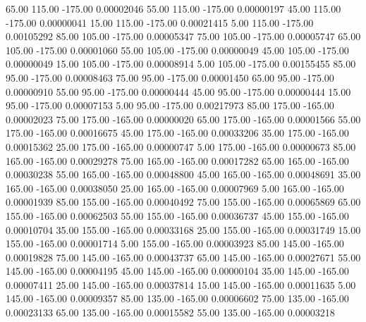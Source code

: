      65.00    115.00   -175.00     0.00002046
     55.00    115.00   -175.00     0.00000197
     45.00    115.00   -175.00     0.00000041
     15.00    115.00   -175.00     0.00021415
      5.00    115.00   -175.00     0.00105292
     85.00    105.00   -175.00     0.00005347
     75.00    105.00   -175.00     0.00005747
     65.00    105.00   -175.00     0.00001060
     55.00    105.00   -175.00     0.00000049
     45.00    105.00   -175.00     0.00000049
     15.00    105.00   -175.00     0.00008914
      5.00    105.00   -175.00     0.00155455
     85.00     95.00   -175.00     0.00008463
     75.00     95.00   -175.00     0.00001450
     65.00     95.00   -175.00     0.00000910
     55.00     95.00   -175.00     0.00000444
     45.00     95.00   -175.00     0.00000444
     15.00     95.00   -175.00     0.00007153
      5.00     95.00   -175.00     0.00217973
     85.00    175.00   -165.00     0.00002023
     75.00    175.00   -165.00     0.00000020
     65.00    175.00   -165.00     0.00001566
     55.00    175.00   -165.00     0.00016675
     45.00    175.00   -165.00     0.00033206
     35.00    175.00   -165.00     0.00015362
     25.00    175.00   -165.00     0.00000747
      5.00    175.00   -165.00     0.00000673
     85.00    165.00   -165.00     0.00029278
     75.00    165.00   -165.00     0.00017282
     65.00    165.00   -165.00     0.00030238
     55.00    165.00   -165.00     0.00048800
     45.00    165.00   -165.00     0.00048691
     35.00    165.00   -165.00     0.00038050
     25.00    165.00   -165.00     0.00007969
      5.00    165.00   -165.00     0.00001939
     85.00    155.00   -165.00     0.00040492
     75.00    155.00   -165.00     0.00065869
     65.00    155.00   -165.00     0.00062503
     55.00    155.00   -165.00     0.00036737
     45.00    155.00   -165.00     0.00010704
     35.00    155.00   -165.00     0.00033168
     25.00    155.00   -165.00     0.00031749
     15.00    155.00   -165.00     0.00001714
      5.00    155.00   -165.00     0.00003923
     85.00    145.00   -165.00     0.00019828
     75.00    145.00   -165.00     0.00043737
     65.00    145.00   -165.00     0.00027671
     55.00    145.00   -165.00     0.00004195
     45.00    145.00   -165.00     0.00000104
     35.00    145.00   -165.00     0.00007411
     25.00    145.00   -165.00     0.00037814
     15.00    145.00   -165.00     0.00011635
      5.00    145.00   -165.00     0.00009357
     85.00    135.00   -165.00     0.00006602
     75.00    135.00   -165.00     0.00023133
     65.00    135.00   -165.00     0.00015582
     55.00    135.00   -165.00     0.00003218
